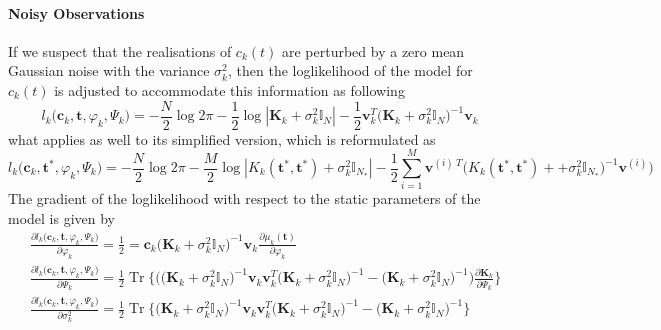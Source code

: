 \documentclass[article,moreauthors,pdftex,10pt,a4paper]{ssrn}
\DeclareMathOperator*{\tr}{\text{Tr}}
\begin{document}
\paragraph{Noisy Observations}
If we suspect that the realisations of $c_k(t)$ are perturbed by a zero mean Gaussian noise with the variance $\sigma^2_k$, then the loglikelihood of the model for $c_k(t)$ is adjusted to accommodate this information as following 
\begin{equation}
l_k\Big( \mathbf{c}_k, \mathbf{t} , \varphi_k, \Psi_k \Big) = - \frac{N}{2} \log 2 \pi - \frac{1}{2} \log |\mathbf{K}_k + \sigma^2_k \mathbb{I}_N | - \frac{1}{2}\mathbf{v}_k^T \Big(\mathbf{K}_k   + \sigma^2_k \mathbb{I}_N \Big)^{-1} \mathbf{v}_k
\end{equation}
what applies as well to its simplified version, which is reformulated as
\begin{equation}
l_k\Big( \mathbf{c}_k, \mathbf{t}^* , \varphi_k, \Psi_k \Big) = - \frac{N}{2} \log 2 \pi - \frac{M}{2} \log |K_k (\mathbf{t}^*,\mathbf{t}^*  ) + \sigma^2_k \mathbb{I}_{N_*} | - \frac{1}{2}\sum_{i = 1}^M \mathbf{v}^{(i) \ T} \Big( K_k (\mathbf{t}^*,\mathbf{t}^*  ) +  + \sigma^2_k \mathbb{I}_{N_*} \Big)^{-1}\mathbf{v}^{(i)} \big) 
\end{equation}
The gradient of the loglikelihood with respect to the static parameters of the model is given by 
\begin{align*}
& \frac{\partial l_k\Big( \mathbf{c}_k, \mathbf{t} , \varphi_k, \Psi_k \Big)}{\partial \varphi_k} = \frac{1}{2} = \mathbf{c}_k \Big(\mathbf{K}_k + \sigma^2_k \mathbb{I}_N\Big)^{-1} \mathbf{v}_k \frac{\partial \mu_k(\mathbf{t})}{\partial \varphi_k} \\
& \frac{\partial l_k\Big( \mathbf{c}_k, \mathbf{t} , \varphi_k, \Psi_k \Big)}{\partial \Psi_k} = \frac{1}{2} \tr \bigg\{\bigg(\Big(\mathbf{K}_k + \sigma^2_k \mathbb{I}_N\Big)^{-1}  \mathbf{v}_k \mathbf{v}_k^T\Big(\mathbf{K}_k + \sigma^2_k \mathbb{I}_N\Big)^{-1} -\Big(\mathbf{K}_k + \sigma^2_k \mathbb{I}_N\Big)^{-1}  \bigg) \frac{\partial \mathbf{K}_k }{ \partial \Psi_k} \bigg\} \\
& \frac{\partial l_k\Big( \mathbf{c}_k , \mathbf{t} , \varphi_k, \Psi_k \Big)}{\partial \sigma^2_k} = \frac{1}{2} \tr \bigg\{\bigg(\mathbf{K}_k + \sigma^2_k \mathbb{I}_N\Big)^{-1}  \mathbf{v}_k \mathbf{v}_k^T\Big(\mathbf{K}_k + \sigma^2_k \mathbb{I}_N\Big)^{-1} -\Big(\mathbf{K}_k + \sigma^2_k \mathbb{I}_N\Big)^{-1}  \bigg\} \\
\end{align*}
\end{document}
